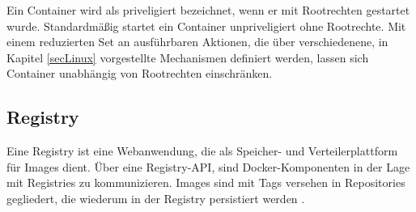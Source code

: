 \documentclass[../main.tex]{subfiles}
\begin{document}
      Ein Container wird als priveligiert bezeichnet, wenn er mit Rootrechten gestartet wurde. Standardmäßig startet ein Container unpriveligiert ohne Rootrechte. Mit einem reduzierten Set an ausführbaren Aktionen, die über verschiedenene, in Kapitel \ref{secLinux} vorgestellte Mechanismen definiert werden, lassen sich Container unabhängig von Rootrechten einschränken.



		\subsection{Registry}
		\label{dockerRegistries}
      Eine Registry ist eine Webanwendung, die als Speicher- und Verteilerplattform für Images dient. Über eine Registry-API, sind Docker-Komponenten in der Lage mit Registries zu kommunizieren. Images sind mit Tags versehen in Repositories gegliedert, die wiederum in der Registry persistiert werden \cite{dockerRegistry}. %
\end{document}
